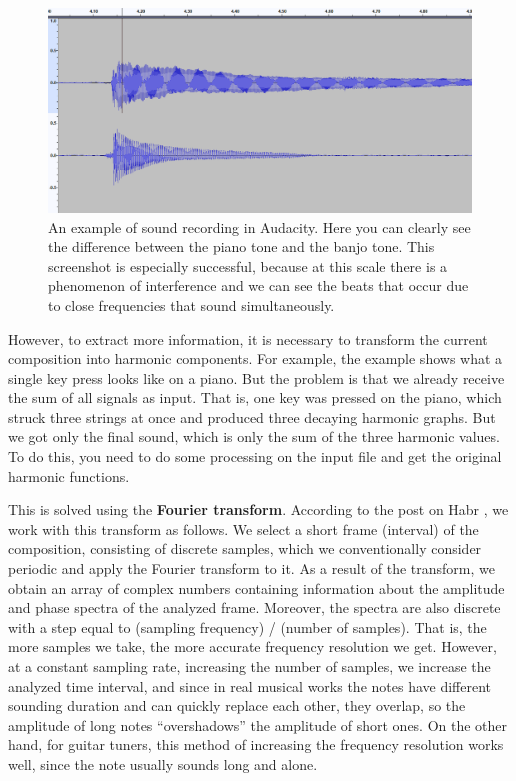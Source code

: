 \documentclass[thesis=B,english]{FITthesis}[2019/12/23]
\begin{document}
\begin{figure}[ht]
            \includegraphics[width=\textwidth]{audacity_3.png}
            \caption[Audacity recording - timbre]{An example of sound recording in Audacity. Here you can clearly see the difference between the piano tone and the banjo tone. This screenshot is especially successful, because at this scale there is a phenomenon of interference and we can see the beats that occur due to close frequencies that sound simultaneously.}
            \label{fig:audacity_3}
\end{figure}

\clearpage

However, to extract more information, it is necessary to transform the current composition into harmonic components. For example, the example shows what a single key press looks like on a piano. But the problem is that we already receive the sum of all signals as input. That is, one key was pressed on the piano, which struck three strings at once and produced three decaying harmonic graphs. But we got only the final sound, which is only the sum of the three harmonic values. To do this, you need to do some processing on the input file and get the original harmonic functions.

This is solved using the \textbf{Fourier transform}. According to the post on Habr \cite{habr_Makeman}, we work with this transform as follows. We select a short frame (interval) of the composition, consisting of discrete samples, which we conventionally consider periodic and apply the Fourier transform to it. As a result of the transform, we obtain an array of complex numbers containing information about the amplitude and phase spectra of the analyzed frame. Moreover, the spectra are also discrete with a step equal to (sampling frequency) / (number of samples). That is, the more samples we take, the more accurate frequency resolution we get. However, at a constant sampling rate, increasing the number of samples, we increase the analyzed time interval, and since in real musical works the notes have different sounding duration and can quickly replace each other, they overlap, so the amplitude of long notes “overshadows” the amplitude of short ones. On the other hand, for guitar tuners, this method of increasing the frequency resolution works well, since the note usually sounds long and alone.
\end{document}
